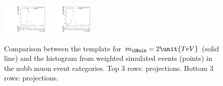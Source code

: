 \begin{figure}[htpb]
  \includegraphics[width=0.2\textwidth]{fig/analysisAppendix/templateVsReco_GbuToWW2000_r0_MJ_mu_HP_vbf_HDy.pdf}
  \includegraphics[width=0.2\textwidth]{fig/analysisAppendix/templateVsReco_GbuToWW2000_r0_MJ_mu_LP_vbf_HDy.pdf}\\
  \caption{
    Comparison between the \ggF\GBulktoWW template for $m_{\GBulk}=2\unit{TeV}$ (solid line) and the histogram from weighted simulated events (points) in the nobb muon event categories.
    Top 3 rows: \MVV projections.
    Bottom 3 rows: \MJ projections.
  }
  \label{fig:1dtemplateVsReco_GbuToWW2000}
\end{figure}

